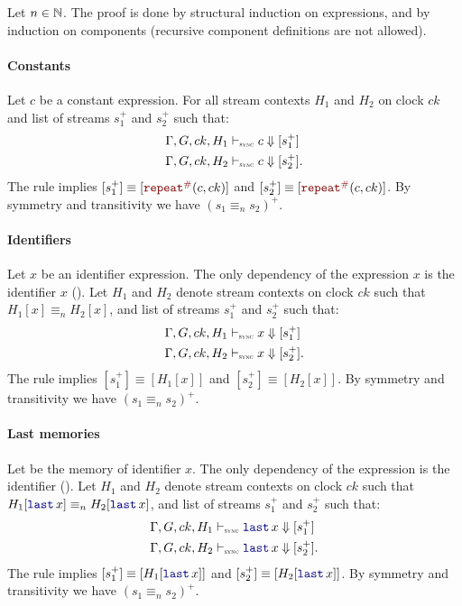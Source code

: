 \begin{skippableproof}
    Let $n \in \N$.
    The proof is done by structural induction on \GRSync expressions, and by
    induction on components (recursive component definitions are not allowed).

    \paragraph{Constants}
    Let $c$ be a constant expression. For all stream contexts $H_1$ and $H_2$ on clock $ck$ and
    list of streams $s_1^+$ and $s_2^+$ such that:
    \begin{align*}
         & \exprDenot{H_1}{ck}{c}{s_1^+}  \\
         & \exprDenot{H_2}{ck}{c}{s_2^+}.
    \end{align*}
    The rule  implies $[s_1^+] \equiv
        [\const{c}{ck}]$ and $[s_2^+] \equiv [\const{c}{ck}]$. By symmetry and
    transitivity we have $(s_1 \equiv_n s_2)^+$.

    \paragraph{Identifiers}

    Let $x$ be an identifier expression. The only dependency of the expression $x$ is the identifier
    $x$ ().
    Let $H_1$ and $H_2$ denote stream contexts on clock $ck$ such that $H_1[x] \equiv_n H_2[x]$, and
    list of streams $s_1^+$ and $s_2^+$ such that:
    \begin{align*}
         & \exprDenot{H_1}{ck}{x}{s_1^+}  \\
         & \exprDenot{H_2}{ck}{x}{s_2^+}.
    \end{align*}
    The rule  implies $[s_1^+] \equiv [H_1[x]]$ and
    $[s_2^+] \equiv [H_2[x]]$. By symmetry and transitivity we have $(s_1 \equiv_n s_2)^+$.

    \paragraph{Last memories}

    Let  be the memory of identifier $x$. The only dependency of the expression  is
    the identifier  ().
    Let $H_1$ and $H_2$ denote stream contexts on clock $ck$ such that $H_1[\last{x}] \equiv_n
        H_2[\last{x}]$, and list of streams $s_1^+$ and $s_2^+$ such that:
    \begin{align*}
         & \exprDenot{H_1}{ck}{\last{x}}{s_1^+}  \\
         & \exprDenot{H_2}{ck}{\last{x}}{s_2^+}.
    \end{align*}
    The rule  implies $[s_1^+] \equiv [H_1[\last{x}]]$
    and $[s_2^+] \equiv [H_2[\last{x}]]$. By symmetry and transitivity we have
    $(s_1 \equiv_n s_2)^+$.


\end{skippableproof}

